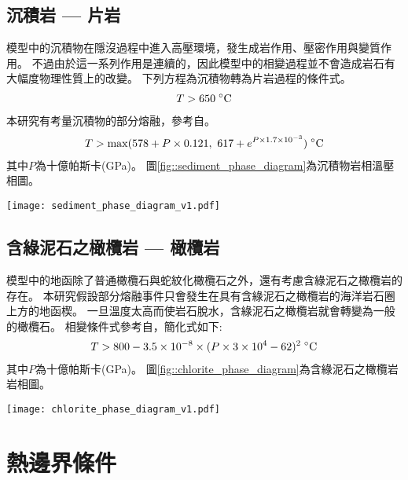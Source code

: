\subsection{沉積岩 --- 片岩}
模型中的沉積物在隱沒過程中進入高壓環境，發生成岩作用、壓密作用與變質作用。
不過由於這一系列作用是連續的，因此模型中的相變過程並不會造成岩石有大幅度物理性質上的改變。
下列方程為沉積物轉為片岩過程的條件式。
\begin{align}
T > 650\; {\rm ^\circ C}
\end{align}
本研究有考量沉積物的部分熔融，參考自\citet{van2011subduction}。
\begin{align}
    T > {\rm max} (578+ P \times 0.121,\ 617+e^{P\times 1.7\times 10^{-3}}) \; {\rm ^\circ C}
\end{align}
其中$P$為十億帕斯卡(GPa)。
圖\ref{fig::sediment_phase_diagram}為沉積物岩相溫壓相圖。
\begin{figure*}[ht!]
    \centering
    \texttt{[image: sediment\_phase\_diagram\_v1.pdf]}
    \caption[沉積物變質岩相圖，參考自\citet{van2011subduction}]{沉積物變質岩相圖，橘線為沉積物含水固相線，參考自\citet{van2011subduction}。}
    \label{fig::sediment_phase_diagram}
\end{figure*}

\subsection{含綠泥石之橄欖岩 --- 橄欖岩}

模型中的地函除了普通橄欖石與蛇紋化橄欖石之外，還有考慮含綠泥石之橄欖岩的存在。
本研究假設部分熔融事件只會發生在具有含綠泥石之橄欖岩的海洋岩石圈上方的地函楔。
一旦溫度太高而使岩石脫水，含綠泥石之橄欖岩就會轉變為一般的橄欖石。
相變條件式參考自\citet{Grove2009}，簡化式如下:
\begin{align}
T > 800-3.5\times 10^{-8}\times (P\times 3 \times 10^{4} -62)^{2} \; {\rm ^\circ C}
\end{align}
其中$P$為十億帕斯卡(GPa)。
圖\ref{fig::chlorite_phase_diagram}為含綠泥石之橄欖岩岩相圖。
\begin{figure*}[ht!]
    \centering
    \texttt{[image: chlorite\_phase\_diagram\_v1.pdf]}
    \caption[含綠泥石之橄欖岩岩相圖，參考自\citet{Grove2009}]{含綠泥石之橄欖岩岩相圖，橘紅線為含綠泥石之橄欖岩脫水相變線，參考自\citet{Grove2009}。}
    \label{fig::chlorite_phase_diagram}
\end{figure*}

\section{熱邊界條件}\label{熱邊界條件}

